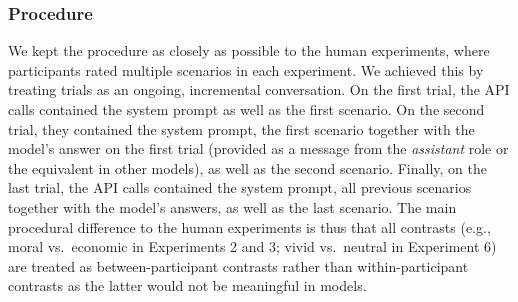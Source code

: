 \documentclass[
]{article}
\begin{document}
\subsubsection{Procedure}\label{procedure}

We kept the procedure as closely as possible to the human experiments, where participants rated multiple scenarios in each experiment. We achieved this by treating trials as an ongoing, incremental conversation. On the first trial, the API calls contained the system prompt as well as the first scenario. On the second trial, they contained the system prompt, the first scenario together with the model's answer on the first trial (provided as a message from the \emph{assistant} role or the equivalent in other models), as well as the second scenario. Finally, on the last trial, the API calls contained the system prompt, all previous scenarios together with the model's answers, as well as the last scenario. The main procedural difference to the human experiments is thus that all contrasts (e.g., moral vs.~economic in Experiments 2 and 3; vivid vs.~neutral in Experiment 6) are treated as between-participant contrasts rather than within-participant contrasts as the latter would not be meaningful in models.
\end{document}
